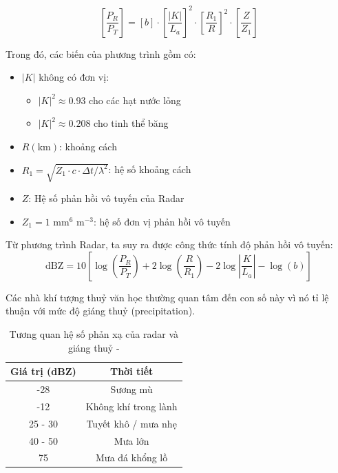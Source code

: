 \[
    \left[ \frac{P_R}{P_T} \right]=\left[ b \right]\cdot\left[ \frac{|K|}{L_a} \right]^2\cdot\left[ \frac{R_1}{R} \right]^2\cdot\left[ \frac{Z}{Z_1} \right]
\]
\vspace{0.5cm}

Trong đó, các biến của phương trình gồm có:
\begin{itemize}
    \item $|K|$ không có đơn vị:
    \begin{itemize}
        \item $|K|^2 \approx 0.93$ cho các hạt nước lỏng
        \item $|K|^2 \approx 0.208$ cho tinh thể băng
    \end{itemize}
    \item $R (\text{km})$: khoảng cách
    \item $R_1 = \sqrt{Z_1 \cdot c \cdot \Delta t / \lambda^2}$: hệ số khoảng cách
    \item $Z$: Hệ số phản hồi vô tuyến của Radar
    \item $Z_1 = 1 \text{ mm}^6 \text{ m}^{-3}$: hệ số đơn vị phản hồi vô tuyến
\end{itemize}

Từ phương trình Radar, ta suy ra được công thức tính độ phản hồi vô tuyến:
\vspace{0.5cm}
\[
    \text{dBZ} = 10\left[ \log\left( \frac{P_R}{P_T} \right) + 2 \log\left( \frac{R}{R_1} \right) - 2\log\left| \frac{K}{L_a} \right| - \log\left( b \right) \right]
\]
\vspace{0.5cm}

Các nhà khí tượng thuỷ văn học thường quan tâm đến con số này vì nó tỉ lệ thuận với mức độ giáng thuỷ (precipitation).
\vspace{0.5cm}

\begin{table}[h]
    \centering
    \begin{tabular}{|c|c|}
        \hline
        Giá trị (dBZ) & Thời tiết \\
        \hline
        -28 & Sương mù \\
        -12 & Không khí trong lành \\
        25 - 30 & Tuyết khô / mưa nhẹ \\
        40 - 50 & Mưa lớn \\
        75 & Mưa đá khổng lồ \\
        \hline
    \end{tabular}
    \vspace{1em}
    \caption{Tương quan hệ số phản xạ của radar và giáng thuỷ - \citet{2022Weather}}
\end{table}

